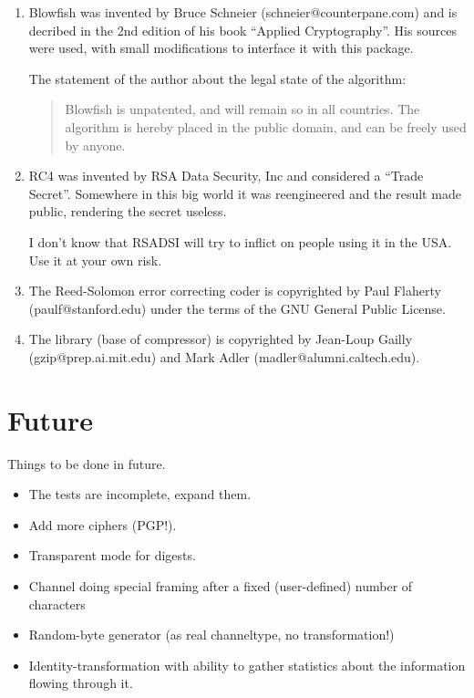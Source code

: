 \begin {enumerate}
\item	Blowfish was invented by Bruce Schneier
	(schneier@counterpane.com) and is decribed in the 2nd edition
	of his book ``Applied Cryptography''. His sources were used,
	with small modifications to interface it with this package.

	The statement of the author about the legal state of the
	algorithm:

	\begin {quotation}
		Blowfish is unpatented, and will remain so in all
		countries. The algorithm is hereby placed in the
		public domain, and can be freely used by anyone.
	\end {quotation}

\item	RC4 was invented by RSA Data Security, Inc and considered a
	``Trade Secret''. Somewhere in this big world it was
	reengineered and the result made public, rendering the secret
	useless.

	I don't know that RSADSI will try to inflict on people using it
	in the USA. Use it at your own risk.

\item	The Reed-Solomon error correcting coder is copyrighted by Paul
	Flaherty (paulf@stanford.edu) under the terms of the GNU
	General Public License.

\item	The library  (base of compressor) is copyrighted by
	Jean-Loup Gailly (gzip@prep.ai.mit.edu) and Mark Adler
	(madler@alumni.caltech.edu).

\end   {enumerate}


\chapter {Future}

Things to be done in future.

\begin {itemize}
\item	The tests are incomplete, expand them.
\item	Add more ciphers (PGP!).
\item	Transparent mode for digests.
\item	Channel doing special framing after a fixed (user-defined)
	number of characters
\item	Random-byte generator (as real channeltype, no transformation!)
\item	Identity-transformation with ability to gather statistics
	about the information flowing through it.
\end   {itemize}


